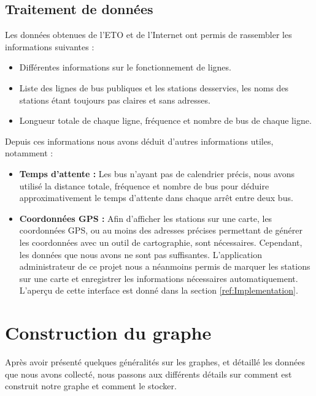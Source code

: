 \subsection{Traitement de données}
Les données obtenues de l'ETO et de l'Internet ont permis de rassembler les informations suivantes :
\begin{itemize}
	\item Différentes informations sur le fonctionnement de lignes.
	\item Liste des lignes de bus publiques et les stations desservies, les noms des stations étant toujours pas claires et sans adresses.
	\item Longueur totale de chaque ligne, fréquence et nombre de bus de chaque ligne.\newline 
\end{itemize}

Depuis ces informations nous avons déduit d'autres informations utiles, notamment :

\begin{itemize}
	\item \textbf{Temps d'attente : } Les bus n'ayant pas de calendrier précis, nous avons utilisé la distance totale, fréquence et nombre de bus pour déduire approximativement le temps d'attente dans chaque arrêt entre deux bus.
	\item \textbf{Coordonnées GPS :} Afin d'afficher les stations sur une carte, les coordonnées GPS, ou au moins des adresses précises permettant de générer les coordonnées avec un outil de cartographie, sont nécessaires. Cependant, les données que nous avons ne sont pas suffisantes.
	L'application administrateur de ce projet nous a néanmoins permis de marquer les stations sur une carte et enregistrer les informations nécessaires automatiquement. L'aperçu de cette interface est donné dans la section \ref{ref:Implementation}.

\end{itemize}

	
\section{Construction du graphe}
Après avoir présenté quelques généralités sur les graphes, et détaillé les données que nous avons collecté, nous passons aux différents détails sur comment est construit notre graphe et comment le stocker.
